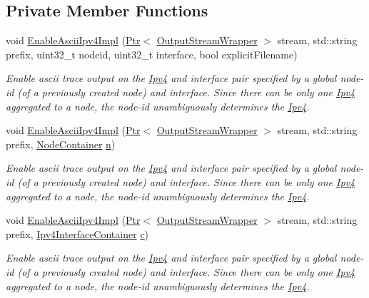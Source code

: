 \subsection*{Private Member Functions}
\begin{DoxyCompactItemize}
\item 
void \hyperlink{classns3_1_1AsciiTraceHelperForIpv4_a1c712e1c3cccedb04d24ba0f834cbc1c}{Enable\+Ascii\+Ipv4\+Impl} (\hyperlink{classns3_1_1Ptr}{Ptr}$<$ \hyperlink{classns3_1_1OutputStreamWrapper}{Output\+Stream\+Wrapper} $>$ stream, std\+::string prefix, uint32\+\_\+t nodeid, uint32\+\_\+t interface, bool explicit\+Filename)
\begin{DoxyCompactList}\small\item\em Enable ascii trace output on the \hyperlink{classns3_1_1Ipv4}{Ipv4} and interface pair specified by a global node-\/id (of a previously created node) and interface. Since there can be only one \hyperlink{classns3_1_1Ipv4}{Ipv4} aggregated to a node, the node-\/id unambiguously determines the \hyperlink{classns3_1_1Ipv4}{Ipv4}. \end{DoxyCompactList}\item 
void \hyperlink{classns3_1_1AsciiTraceHelperForIpv4_a200c5a6d43d0f991da1920dbf6f9dfd8}{Enable\+Ascii\+Ipv4\+Impl} (\hyperlink{classns3_1_1Ptr}{Ptr}$<$ \hyperlink{classns3_1_1OutputStreamWrapper}{Output\+Stream\+Wrapper} $>$ stream, std\+::string prefix, \hyperlink{classns3_1_1NodeContainer}{Node\+Container} \hyperlink{lte__link__budget__x2__handover__measures_8m_abdb05bc5a064cf642a06c83b3392f148}{n})
\begin{DoxyCompactList}\small\item\em Enable ascii trace output on the \hyperlink{classns3_1_1Ipv4}{Ipv4} and interface pair specified by a global node-\/id (of a previously created node) and interface. Since there can be only one \hyperlink{classns3_1_1Ipv4}{Ipv4} aggregated to a node, the node-\/id unambiguously determines the \hyperlink{classns3_1_1Ipv4}{Ipv4}. \end{DoxyCompactList}\item 
void \hyperlink{classns3_1_1AsciiTraceHelperForIpv4_a526754b964ad6f76c69881140ea10730}{Enable\+Ascii\+Ipv4\+Impl} (\hyperlink{classns3_1_1Ptr}{Ptr}$<$ \hyperlink{classns3_1_1OutputStreamWrapper}{Output\+Stream\+Wrapper} $>$ stream, std\+::string prefix, \hyperlink{classns3_1_1Ipv4InterfaceContainer}{Ipv4\+Interface\+Container} \hyperlink{mmwave_2model_2fading-traces_2fading__trace__generator_8m_ae0323a9039add2978bf5b49550572c7c}{c})
\begin{DoxyCompactList}\small\item\em Enable ascii trace output on the \hyperlink{classns3_1_1Ipv4}{Ipv4} and interface pair specified by a global node-\/id (of a previously created node) and interface. Since there can be only one \hyperlink{classns3_1_1Ipv4}{Ipv4} aggregated to a node, the node-\/id unambiguously determines the \hyperlink{classns3_1_1Ipv4}{Ipv4}. \end{DoxyCompactList}\item 

\end{DoxyCompactItemize}
